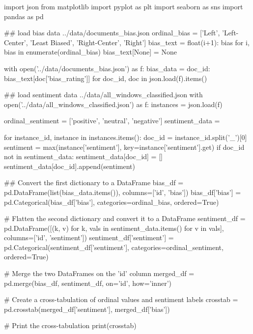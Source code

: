 

\begin{pyin}
import json
from matplotlib import pyplot as plt
import seaborn as sns
import pandas as pd
\end{pyin}

\begin{pyin}
\## load bias data ../data/documents_bias.json
ordinal_bias = ['Left', 'Left-Center', 'Least Biased', 'Right-Center', 'Right']
bias_text = {float(i+1): bias for i, bias in enumerate(ordinal_bias)}
bias_text[None] = None

with open('../data/documents_bias.json') as f:
    bias_data = {doc_id: bias_text[doc['bias_rating']] for doc_id, doc in json.load(f).items()}
\end{pyin}

\begin{pyin}
\## load sentiment data ../data/all_windows_classified.json
with open('../data/all_windows_classified.json') as f:
    instances = json.load(f)

ordinal_sentiment = ['positive', 'neutral', 'negative']
sentiment_data = {}

for instance_id, instance in instances.items():
    doc_id = instance_id.split('_')[0]
    sentiment = max(instance['sentiment'], key=instance['sentiment'].get)
    if doc_id not in sentiment_data:
        sentiment_data[doc_id] = []
    sentiment_data[doc_id].append(sentiment)
\end{pyin}


\begin{pyin}
\## Convert the first dictionary to a DataFrame
bias_df = pd.DataFrame(list(bias_data.items()), columns=['id', 'bias'])
bias_df['bias'] = pd.Categorical(bias_df['bias'], categories=ordinal_bias, ordered=True)

# Flatten the second dictionary and convert it to a DataFrame
sentiment_df = pd.DataFrame([(k, v) for k, vals in sentiment_data.items() for v in vals],
                            columns=['id', 'sentiment'])
sentiment_df['sentiment'] = pd.Categorical(sentiment_df['sentiment'], categories=ordinal_sentiment, ordered=True)

# Merge the two DataFrames on the 'id' column
merged_df = pd.merge(bias_df, sentiment_df, on='id', how='inner')

# Create a cross-tabulation of ordinal values and sentiment labels
crosstab = pd.crosstab(merged_df['sentiment'], merged_df['bias'])

# Print the cross-tabulation
print(crosstab)
\end{pyin}


